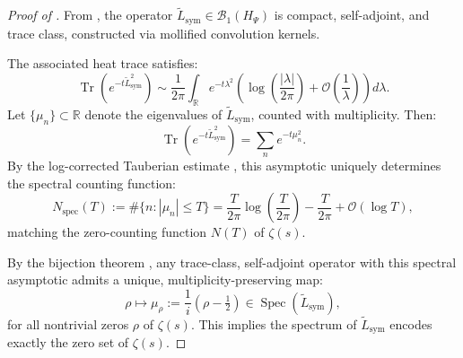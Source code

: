 \begin{proof}[Proof of ]
From , the operator $\tilde{L}_{\mathrm{sym}} \in \mathcal{B}_1(H_\Psi)$ is compact, self-adjoint, and trace class, constructed via mollified convolution kernels.

The associated heat trace satisfies:
\[
\operatorname{Tr}(e^{-t \tilde{L}_{\mathrm{sym}}^2}) \sim \frac{1}{2\pi} \int_{\mathbb{R}} e^{-t \lambda^2} \left( \log\left( \frac{|\lambda|}{2\pi} \right) + \mathcal{O}\left( \frac{1}{\lambda} \right) \right) d\lambda.
\]
Let $\{ \mu_n \} \subset \mathbb{R}$ denote the eigenvalues of $\tilde{L}_{\mathrm{sym}}$, counted with multiplicity. Then:
\[
\operatorname{Tr}(e^{-t \tilde{L}_{\mathrm{sym}}^2}) = \sum_n e^{-t \mu_n^2}.
\]
By the log-corrected Tauberian estimate , this asymptotic uniquely determines the spectral counting function:
\[
N_{\mathrm{spec}}(T) := \#\{ n : |\mu_n| \leq T \} = \frac{T}{2\pi} \log \left( \frac{T}{2\pi} \right) - \frac{T}{2\pi} + \mathcal{O}(\log T),
\]
matching the zero-counting function $N(T)$ of $\zeta(s)$.

By the bijection theorem , any trace-class, self-adjoint operator with this spectral asymptotic admits a unique, multiplicity-preserving map:
\[
\rho \mapsto \mu_\rho := \frac{1}{i}(\rho - \tfrac{1}{2}) \in \operatorname{Spec}(\tilde{L}_{\mathrm{sym}}),
\]
for all nontrivial zeros $\rho$ of $\zeta(s)$. This implies the spectrum of $\tilde{L}_{\mathrm{sym}}$ encodes exactly the zero set of $\zeta(s)$.
\end{proof}
